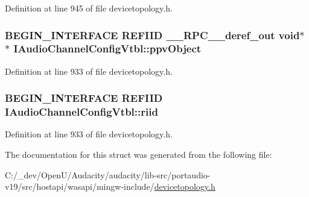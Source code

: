 Definition at line 945 of file devicetopology.\+h.

\subsubsection[{\texorpdfstring{ppv\+Object}{ppvObject}}]{\setlength{\rightskip}{0pt plus 5cm}B\+E\+G\+I\+N\+\_\+\+I\+N\+T\+E\+R\+F\+A\+CE {\bf R\+E\+F\+I\+ID} {\bf \+\_\+\+\_\+\+R\+P\+C\+\_\+\+\_\+deref\+\_\+out} {\bf void}$\ast$$\ast$ I\+Audio\+Channel\+Config\+Vtbl\+::ppv\+Object}\hypertarget{struct_i_audio_channel_config_vtbl_ad5c78b661e2d4585aa47b1b0288886e9}{}\label{struct_i_audio_channel_config_vtbl_ad5c78b661e2d4585aa47b1b0288886e9}


Definition at line 933 of file devicetopology.\+h.

\subsubsection[{\texorpdfstring{riid}{riid}}]{\setlength{\rightskip}{0pt plus 5cm}B\+E\+G\+I\+N\+\_\+\+I\+N\+T\+E\+R\+F\+A\+CE {\bf R\+E\+F\+I\+ID} I\+Audio\+Channel\+Config\+Vtbl\+::riid}\hypertarget{struct_i_audio_channel_config_vtbl_ac0fa634790764a358b447fe14abb0cbb}{}\label{struct_i_audio_channel_config_vtbl_ac0fa634790764a358b447fe14abb0cbb}


Definition at line 933 of file devicetopology.\+h.



The documentation for this struct was generated from the following file\+:\begin{DoxyCompactItemize}
\item 
C\+:/\+\_\+dev/\+Open\+U/\+Audacity/audacity/lib-\/src/portaudio-\/v19/src/hostapi/wasapi/mingw-\/include/\hyperlink{devicetopology_8h}{devicetopology.\+h}\end{DoxyCompactItemize}
